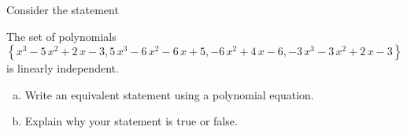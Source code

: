 
\begin{exerciseStatement}


Consider the statement 
\begin{center}\begin{minipage}{0.8\textwidth}
 The set of polynomials \( \left\{ x^{3} - 5 \, x^{2} + 2 \, x - 3 , 5 \, x^{3} - 6 \, x^{2} - 6 \, x + 5 , -6 \, x^{2} + 4 \, x - 6 , -3 \, x^{3} - 3 \, x^{2} + 2 \, x - 3 \right\} \) is linearly independent.
\end{minipage}\end{center}
    


\begin{enumerate}[(a)]
\item  Write an equivalent statement using a polynomial equation.
\item  Explain why your statement is true or false.
\end{enumerate}
    
\end{exerciseStatement}
    
